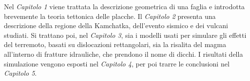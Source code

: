 Nel \textit{Capitolo 1} viene trattata la descrizione geometrica di una faglia e introdotta brevemente la teoria tettonica delle placche.
Il \textit{Capitolo 2} presenta una descrizione della regione della Kamchatka, dell'evento sismico e dei vulcani studiati.
Si trattano poi, nel \textit{Capitolo 3}, sia i modelli usati per simulare gli effetti del terremoto, basati su dislocazioni rettangolari, sia la risalita del magma all'interno di fratture idrauliche, che prendono il nome di dicchi. I risultati della simulazione vengono esposti nel \textit{Capitolo 4}, per poi trarre le conclusioni nel \textit{Capitolo 5}.

